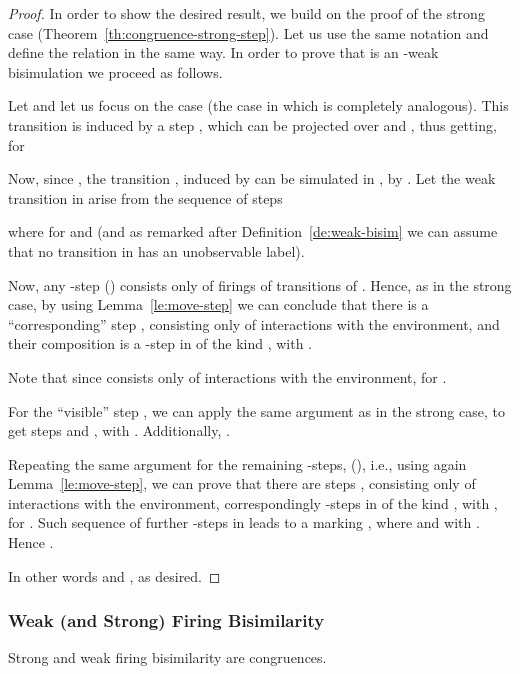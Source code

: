 \documentclass{LMCS}
\begin{document}
\begin{proof}
  In order to show the desired result, we build on the proof of the
  strong case (Theorem~\ref{th:congruence-strong-step}).
Let us use the same notation and define the relation  in the
  same way. In order to prove that  is an
  -weak bisimulation we proceed as follows.


  Let  and let us focus on the case
   (the case in which  is completely
  analogous). This transition is induced by a step , which can be projected over  and , thus getting,
  for 
  \begin{center}
    
  \end{center}
  Now, since , the transition , induced by  can
  be simulated in , by .  Let the weak
  transition in  arise from the sequence of steps
  \begin{center}
    
  \end{center}
  where  for  and
   (and as remarked after
  Definition~\ref{de:weak-bisim} we can assume that no transition in
   has an unobservable label).

  Now, any -step  ()
  consists only of firings of transitions of . Hence, as in the
  strong case, by using Lemma~\ref{le:move-step} we can conclude that
  there is a ``corresponding'' step ,
  consisting only of interactions with the environment, and their
  composition is a -step in  of the kind , with
  .

  Note that since  consists only of
  interactions with the environment,  for .

For the ``visible'' step , we can apply
the same argument as in the strong case, to get steps  and , with
.  Additionally, .

Repeating the same argument for the remaining -steps,  (), i.e., using again
Lemma~\ref{le:move-step}, we can prove that there are steps , consisting only of interactions with the
environment, correspondingly -steps in  of the kind , with
, for .
Such sequence of further -steps in  leads to a marking
, where  and  with . Hence .

In other words  and , as desired.
\end{proof}


\subsubsection{Weak (and Strong) Firing Bisimilarity}


\begin{thm}
  \label{th:congruence-firing}
  Strong and weak firing bisimilarity are congruences.
\end{thm}
\end{document}
